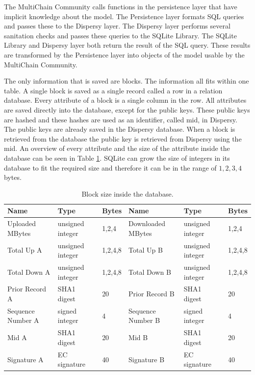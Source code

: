 The MultiChain Community calls functions in the persistence layer that have implicit knowledge about the model.
The Persistence layer formats SQL queries and passes these to the Dispersy layer.
The Dispersy layer performs several sanitation checks and passes these queries to the SQLite Library.
The SQLite Library and Dispersy layer both return the result of the SQL query.
These results are transformed by the Persistence layer into objects of the model usable by the MultiChain Community.

The only information that is saved are blocks.
The information all fits within one table.
A single block is saved as a single record called a row in a relation database.
Every attribute of a block is a single column in the row.
All attributes are saved directly into the database,
except for the public keys.
These public keys are hashed and these hashes are used as an identifier, called mid, in Dispersy.
The public keys are already saved in the Dispersy database.
When a block is retrieved from the database the public key is retrieved from Dispersy using the mid.
An overview of every attribute and the size of the attribute inside the database can be seen in Table \ref{table:block_size_persistence}.
SQLite can grow the size of integers in its database to fit the required size
and therefore it can be in the range of $1,2,3,4$ bytes.

\begin{table}[]
\begin{adjustwidth}{-.5in}{-.5in}
\begin{center}
\begin{tabular}{lll||lll}
Name              & Type             & Bytes                  & Name              & Type             & Bytes    \\ \hline
Uploaded MBytes   & unsigned integer & 1,2,4                  & Downloaded MBytes & unsigned integer & 1,2,4    \\
Total Up A        & unsigned integer & 1,2,4,8                & Total Up B        & unsigned integer & 1,2,4,8  \\
Total Down A      & unsigned integer & 1,2,4,8                & Total Down B      & unsigned integer & 1,2,4,8  \\
Prior Record A    & SHA1 digest      & 20                     & Prior Record B    & SHA1 digest      & 20       \\
Sequence Number A & signed integer   & 4                      & Sequence Number B & signed integer   & 4        \\
Mid A             & SHA1 digest      & 20                     & Mid B             & SHA1 digest      & 20       \\
Signature A       & EC signature     & 40                     & Signature B       & EC signature     & 40
\end{tabular}
\caption{Block size inside the database.}
\label{table:block_size_persistence}
\end{center}
\end{adjustwidth}
\end{table}

